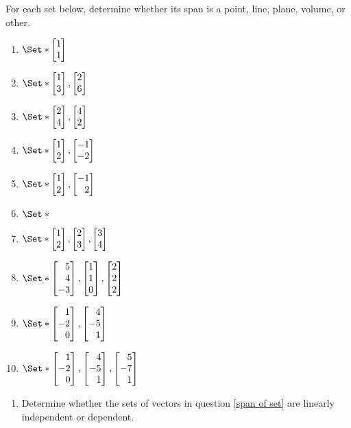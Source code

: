 \begin{exercises}
	\begin{problist}
		\prob
		For each set below, determine whether its span is a point, line, plane, volume, or other.
		\label{span of set}
		\begin{enumerate}
				\item   $\Set*{\mat{1\\1}}$ %
				\item   $\Set*{\mat{1\\3},\mat{2\\6}}$ %
				\item   $\Set*{\mat{2\\4},\mat{4\\2}}$ %
				\item   $\Set*{\mat{1\\2},\mat{-1\\-2}}$ %
				\item   $\Set*{\mat{1\\2},\mat{-1\\2}}$ %
				\item   $\Set*{}$
				\item		$\Set*{\mat{1\\2},\mat{2\\3},\mat{3\\4}}$ %
				\item   $\Set*{\mat{5\\4\\-3},\mat{1\\1\\0},\mat{2\\2\\2}}$ %
				\item   $\Set*{\mat{1\\-2\\0},\mat{4\\-5\\1}}$ %
				\item   $\Set*{\mat{1\\-2\\0},\mat{4\\-5\\1},\mat{5\\-7\\1}}$ %
		\end{enumerate}
		\prob
		\begin{enumerate}
			\item Determine whether the sets of vectors in question \ref{span of set} are linearly
			independent or dependent.


\end{enumerate}
\end{problist}
\end{exercises}
